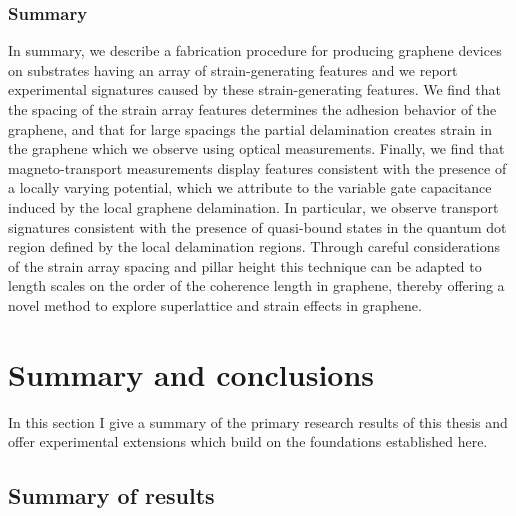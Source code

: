 \documentclass[edeposit,fullpage,draftthesis]{uiucthesis2009}
\begin{document}
            
    \subsection{Summary}
    
            In summary, we describe a fabrication procedure for producing graphene devices on
            substrates having an array of strain-generating features and we report experimental signatures
            caused by these strain-generating features. We find that the spacing of the strain array features
            determines the adhesion behavior of the graphene, and that for large spacings the partial
            delamination creates strain in the graphene which we observe using optical measurements. 
            Finally, we find that magneto-transport measurements
            display features consistent with the presence of a locally varying potential, which we attribute to the 
            variable gate capacitance induced by the local graphene delamination. 
            In particular, we observe
            transport signatures consistent with the presence of quasi-bound states in the quantum
            dot region defined by the local delamination regions.
            Through careful considerations of the strain array spacing and pillar height
            this technique can be adapted to length scales on the order of the coherence length in
            graphene, thereby offering a novel method to explore superlattice and strain effects in graphene.
            


\chapter{Summary and conclusions}
\label{sec:ch:summary}

    In this section I give a summary of the primary research results of this thesis 
    and offer experimental extensions which build on the foundations established here.
    
    \section{Summary of results}
     
\end{document}
